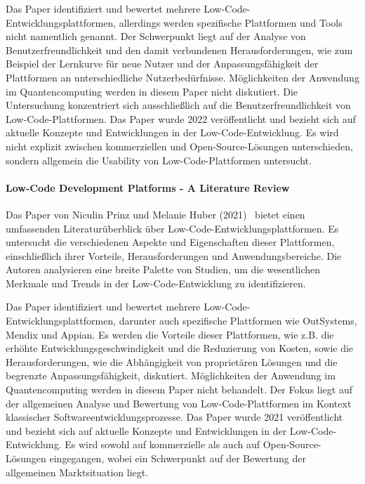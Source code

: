 Das Paper identifiziert und bewertet mehrere Low-Code-Entwicklungsplattformen, allerdings werden spezifische Plattformen 
und Tools nicht namentlich genannt. Der Schwerpunkt liegt auf der Analyse von Benutzerfreundlichkeit und den damit 
verbundenen Herausforderungen, wie zum Beispiel der Lernkurve für neue Nutzer und der Anpassungsfähigkeit der 
Plattformen an unterschiedliche Nutzerbedürfnisse. 
Möglichkeiten der Anwendung im Quantencomputing werden in diesem Paper nicht diskutiert. 
Die Untersuchung konzentriert sich ausschließlich auf die Benutzerfreundlichkeit von Low-Code-Plattformen. 
Das Paper wurde 2022 veröffentlicht und bezieht sich auf aktuelle Konzepte und Entwicklungen in der Low-Code-Entwicklung. 
Es wird nicht explizit zwischen kommerziellen und Open-Source-Lösungen unterschieden, 
sondern allgemein die Usability von Low-Code-Plattformen untersucht.

\paragraph{Low-Code Development Platforms - A Literature Review}

Das Paper von Niculin Prinz und Melanie Huber (2021)~\cite{Prinz_2021} bietet einen umfassenden Literaturüberblick über Low-Code-Entwicklungsplattformen. 
Es untersucht die verschiedenen Aspekte und Eigenschaften dieser Plattformen, einschließlich ihrer Vorteile, Herausforderungen 
und Anwendungsbereiche. Die Autoren analysieren eine breite Palette von Studien, um die wesentlichen Merkmale und Trends 
in der Low-Code-Entwicklung zu identifizieren.

Das Paper identifiziert und bewertet mehrere Low-Code-Entwicklungsplattformen, darunter auch spezifische Plattformen wie 
OutSystems, Mendix und Appian. Es werden die Vorteile dieser Plattformen, wie z.B. die erhöhte Entwicklungsgeschwindigkeit und 
die Reduzierung von Kosten, sowie die Herausforderungen, wie die Abhängigkeit von proprietären Lösungen und die begrenzte 
Anpassungsfähigkeit, diskutiert. Möglichkeiten der Anwendung im Quantencomputing werden in diesem Paper nicht behandelt. 
Der Fokus liegt auf der allgemeinen Analyse und Bewertung von Low-Code-Plattformen im Kontext 
klassischer Softwareentwicklungsprozesse. Das Paper wurde 2021 veröffentlicht und 
bezieht sich auf aktuelle Konzepte und Entwicklungen in der Low-Code-Entwicklung. Es wird sowohl auf kommerzielle als 
auch auf Open-Source-Lösungen eingegangen, wobei ein Schwerpunkt auf der Bewertung der allgemeinen Marktsituation liegt.

